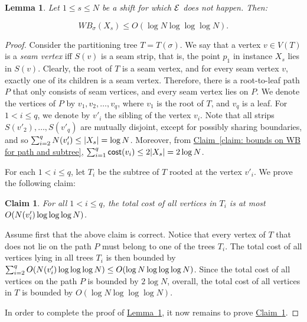 \documentclass[11pt]{article}
\numberwithin{equation}{section}
\newtheorem{lemma}[theorem]{Lemma}
\newtheorem{claim}[theorem]{Claim}
\theoremstyle{definition}
\theoremstyle{plain}
\newcommand{\expref}[2]{\hyperref[#2]{#1~\ref{#2}}}
\begin{document}
\begin{lemma}\label{lem: no bad event low cost}
	Let $1\leq s\leq N$ be a shift for which ${\cal{E}}$ does not happen. Then:
	
	 $$WB_{\sigma}(X_s)\leq O(\log N\log\log\log N).$$
\end{lemma}

\begin{proof}
	Consider the partitioning tree $T=T(\sigma)$. 
We say that a vertex $v\in V(T)$ is a \emph{seam vertex} iff $S(v)$ is a seam strip, that is, the point $p_1$ in instance $X_s$ lies in $S(v)$.  
Clearly, the root of $T$ is a seam vertex, and for every seam vertex $v$, exactly one of its children is a seam vertex. 
Therefore, there is a root-to-leaf path $P$ that only consists of seam vertices, and every seam vertex lies on $P$. 
We denote the vertices of $P$ by $v_1,v_2,\ldots,v_q$, where $v_1$ is the root of $T$, and $v_q$ is a leaf. 
For $1<i\leq q$, we denote by $v'_i$ the sibling of the vertex $v_i$. 
Note that all strips $S(v'_2),\ldots,S(v'_q)$ are mutually disjoint, except for possibly sharing boundaries, and so $\sum_{i=2}^qN(v'_i)\leq |X_s|= \log N$. 
Moreover, from \expref{Claim}{claim: bounds on WB for path and subtree}, $\sum_{i=1}^q\mathsf{cost}(v_i)\leq 2|X_s|=2\log N$.
	
For each $1<i\leq q$, let $T_i$ be the subtree of $T$ rooted at the vertex $v'_i$. We prove the following claim:
	
	\begin{claim}\label{claim: bounding subtrees}
		For all $1<i\leq q$, the total cost of all vertices in $T_i$ is at most $O(N(v'_i)\log\log\log N)$.
	\end{claim}
	
	Assume first that the above claim is correct. Notice that every vertex of $T$ that does not lie on the path $P$ must belong to one of the trees $T_i$. 
The total cost of all vertices lying in all trees $T_i$ is then bounded by $\sum_{i=2}^qO(N(v'_i)\log\log\log N)\leq O(\log N\log\log\log N)$. 
Since the total cost of all vertices on the path $P$ is bounded by $2\log N$, overall, the total cost of all vertices in $T$ is bounded by $O(\log N\log\log\log N)$.


In order to complete the proof of \expref{Lemma}{lem: no bad event low cost}, it now remains to prove \expref{Claim}{claim: bounding subtrees}.


\end{proof}
\end{document}
